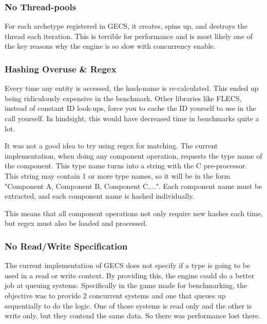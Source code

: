 \subsubsection{No Thread-pools}
For each archetype registered in GECS, it creates, spins up, and destroys the thread each iteration. This is terrible for performance and is most likely one of the key reasons why the engine is so slow with concurrency enable.

\subsubsection{Hashing Overuse \& Regex}
Every time any entity is accessed, the hash-name is re-calculated. This ended up being ridiculously expensive in the benchmark. Other libraries like FLECS, instead of constant ID look-ups, force you to cache the ID yourself to use in the call yourself. In hindsight, this would have decreased time in benchmarks quite a lot.

It was not a good idea to try using regex for matching. The current implementation, when doing any component operation, requests the type name of the component. This type name turns into a string with the C pre-processor. This string may contain 1 or more type names, so it will be in the form "Component A, Component B, Component C,...". Each component name must be extracted, and each component name is hashed individually. 

This means that all component operations not only require new hashes each time, but regex must also be loaded and processed.

\subsubsection{No Read/Write Specification}
The current implementation of GECS does not specify if a type is going to be used in a read or write context. By providing this, the engine could do a better job at queuing systems. Specifically in the game made for benchmarking, the objective was to provide 2 concurrent systems and one that queues up sequentially to do the logic. One of those systems is read only and the other is write only, but they contend the same data. So there was performance lost there.

\newpage